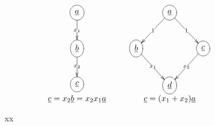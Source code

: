 \begin{figure}
$$
\begin{array}{ccc}
\xymatrix{
\Circle{\rva}
\ar[d]|{x_1}
\\
\Circle{\rvb}
\ar[d]|{x_2}
\\
\Circle{\rvc}
}
&\;\;\;&
\xymatrix{
&\Circle{\rva}\ar[dl]|1
\ar[dr]|1
\\
\Circle{\rvb}\ar[dr]|{x_1}
&&\Circle{\rvc}\ar[dl]|{x_2}
\\
&\Circle{\rvd}
}
\\
\rvc=x_2\rvb=x_2x_1\rva
&&
\rvc= (x_1 + x_2)\rva
\end{array}
$$
\caption{xx}
\label{fig-bdd-and-or}
\end{figure}